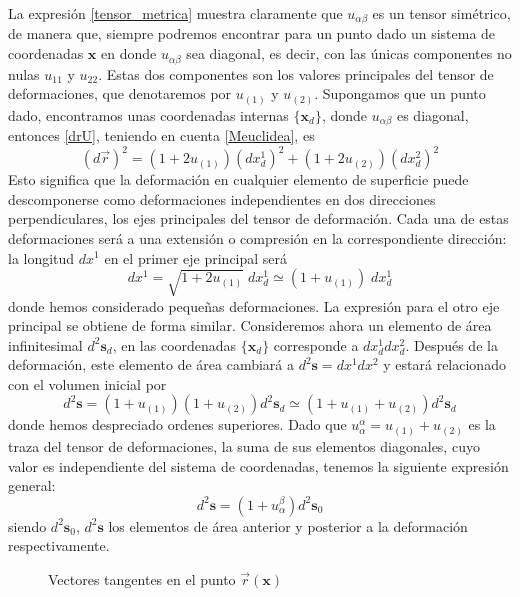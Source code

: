 La expresión \eqref{tensor_metrica} muestra claramente que $u_{\alpha\beta}$
es un tensor simétrico, de manera que, siempre 
podremos encontrar para un punto dado un sistema de coordenadas $\mathbf{x}$ en donde
$u_{\alpha\beta}$ sea diagonal, es decir, con las únicas componentes no nulas
$u_{11}$ y $u_{22}$. Estas dos componentes son los valores
principales del tensor de deformaciones, que denotaremos por $u_{(1)}$ y
$u_{(2)}$. Supongamos que un punto dado, encontramos unas coordenadas internas
$\{\mathbf{x}_d\}$, donde $u_{\alpha\beta}$ es diagonal, entonces \eqref{drU},
teniendo en cuenta \eqref{Meuclidea}, es 
\begin{equation}
(d\vec{r})^2=(1+2u_{(1)})(dx_d^{1})^2+(1+2u_{(2)})(dx_d^{2})^2
\end{equation}
Esto significa que la deformación en cualquier elemento de superficie puede
descomponerse como deformaciones independientes en dos direcciones
perpendiculares, los ejes principales del tensor de deformación. Cada una de
estas deformaciones será a una extensión o compresión en la correspondiente
dirección: la longitud $dx^1$ en el primer eje principal será
\begin{equation}
dx^1=\sqrt{1+2u_{(1)}}\; dx^1_d\simeq (1+u_{(1)})\; dx^1_d
\end{equation}
donde hemos considerado pequeñas deformaciones. La expresión para el otro eje
principal se obtiene de forma similar. Consideremos ahora un elemento
de área infinitesimal $d^2\mathbf{s}_d$, en las coordenadas $\{\mathbf{x}_d\}$
corresponde a $dx_d^1dx_d^2$. Después de la deformación, este elemento de área
cambiará a $d^2\mathbf{s}=dx^1dx^2$ y estará relacionado con el volumen inicial por
\begin{equation*}
d^2\mathbf{s}=(1+u_{(1)})(1+u_{(2)})d^2\mathbf{s}_d\simeq (1+u_{(1)}+u_{(2)})d^2\mathbf{s}_d
\end{equation*}
donde hemos despreciado ordenes superiores. Dado que
$u_{\alpha}^{\alpha}=u_{(1)}+u_{(2)}$ es la traza del tensor de deformaciones, la
suma de sus elementos diagonales, cuyo valor es independiente del sistema de
coordenadas, tenemos la siguiente expresión general:
\begin{equation}\label{deformacion_area}
d^2\mathbf{s}=(1+u_{\alpha}^{\beta})d^2\mathbf{s}_0
\end{equation}
siendo $d^2\mathbf{s}_0$, $d^2\mathbf{s}$ los elementos de área anterior y
posterior a la deformación respectivamente.

\begin{figure}[h]
\centering
 
\caption{Vectores tangentes en el punto $\vec{r}(\mathbf{x})$}
\end{figure}

